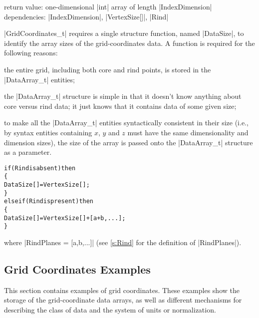 \noindent return value: one-dimensional |int| array of length
                        |IndexDimension| \\
\noindent dependencies: |IndexDimension|, |VertexSize[]|, |Rind|

|GridCoordinates_t| requires a single structure function, named |DataSize|,
to identify the array sizes of the grid-coordinates data.  A function is 
required for the following reasons:
\begin{myitemize}
\item
 the entire grid, including both core and rind points, is stored in 
 the |DataArray_t| entities;
\item
 the |DataArray_t| structure is simple in that it doesn't know anything
 about core versus rind data; it just knows that it contains data 
 of some given size;
\item
 to make all the |DataArray_t| entities syntactically consistent in
 their size (i.e., by syntax entities containing $x$, $y$ and $z$ must
 have the same dimensionality and dimension sizes), the size of the
 array is passed onto the |DataArray_t| structure as a parameter.
\end{myitemize}

\begin{alltt}
  if (Rind is absent) then
    \{
    DataSize[] = VertexSize[] ;
    \}
  else if (Rind is present) then
    \{ 
    DataSize[] = VertexSize[] + [a + b,...] ;
    \}
\end{alltt}
where |RindPlanes = [a,b,...]| (see \autoref{s:Rind} 
for the definition of |RindPlanes|). 

\subsection{Grid Coordinates Examples}
\label{s:grid_example}

\enlargethispage{\baselineskip}
This section contains examples of grid coordinates.  These examples
show the storage of the grid-coordinate data arrays, as well as different
mechanisms for describing the class of data and the system of units or
normalization.

